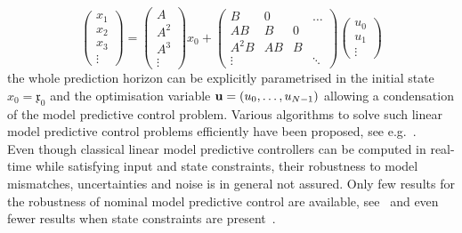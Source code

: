 \begin{equation}
	\left(\begin{array}{c}
	x_1\\x_2\\x_3\\ \vdots
	\end{array}\right) = \left(\begin{array}{c}A\\ A^2 \\ A^3\\ \vdots\end{array}\right)x_0 +  \left(
	\begin{array}{cccc}
	B & 0& &\dots \\
	AB & B & 0 & \\
	A^2B & AB & B & \\
	\vdots & & & \ddots 
	\end{array}\right)\left(\begin{array}{c}u_0\\u_1\\ \vdots\end{array}\right)
\end{equation}
%
the whole prediction horizon can be explicitly parametrised in the initial state $x_0=\mathfrak{x}_0$ and the optimisation variable $\mathbf{u}=(u_0,\dots,u_{N-1})$ allowing a condensation of the model predictive control problem.
%
Various algorithms to solve such linear model predictive control problems efficiently have been proposed, see e.g.~\cite{Mayne:1995,Rubagotti:2013,Wright:1997}.
%
\\[1em]
%
Even though classical linear model predictive controllers can be computed in real-time while satisfying input and state constraints, their robustness to model mismatches, uncertainties and noise is in general not assured. 
%
Only few results for the robustness of nominal model predictive control are available, see~\cite{Nicolao:1996,Nicolao:2000,Magni:1997} and even fewer results when state constraints are present~\cite{Michalska:1993}.
%
%
